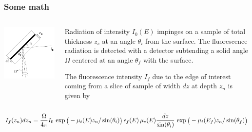 \documentclass[10pt, xcolor=x11names, compress, handout]{beamer}
\begin{document}
\begin{frame}
  \frametitle{Some math}

  \small
  \begin{columns}
    \begin{column}{0.35\linewidth}
      \includegraphics[width=\linewidth]{images/schematic.png}
    \end{column}
    \begin{column}{0.65\linewidth}
      Radiation of intensity $I_0(E)$ impinges on a sample of total
      thickness $z_s$ at an angle $\theta_i$ from the surface. The
      fluorescence radiation is detected with a detector subtending a solid
      angle $\Omega$ centered at an angle $\theta_f$ with the surface.

      \smallskip
      
      The fluorescence intensity $I_f$ due to the edge of interest coming
      from a slice of sample of width $dz$ at depth $z_n$ is given by
    \end{column}
  \end{columns}

  \begin{equation}
    \scriptsize
    \label{eq:dz}
    I_f(z_n)dz_n = \frac{\Omega}{4\pi} I_0\,\exp\big(-\mu_t(E)z_n/\sin(\theta_i)\big)
    \,\epsilon_f(E)\,\mu_e(E) \frac{dz}{\sin(\theta_i)}\,
    \exp\big(-\mu_t(E_f)z_n/\sin(\theta_f)\big)
  \end{equation}


\end{frame}
\end{document}
